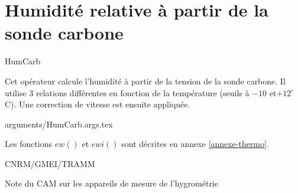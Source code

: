 %
\section{Humidit\'e relative \`a partir de la sonde carbone}

 {\sf HumCarb}

Cet op\'erateur calcule l'humidit\'e \`a partir de la tension
de la sonde carbone. Il utilise 3 relations diff\'erentes en 
fonction de la temp\'erature (seuils \`a $-10$ et$+12^\circ$C).\newline
Une correction de vitesse est ensuite appliqu\'ee.

\bigskip
 {arguments/HumCarb.args.tex}





Les fonctions $ew()$ et $ewi()$ sont d\'ecrites en annexe \ref{annexe-thermo}. 

CNRM/GMEI/TRAMM

Note du CAM sur les appareils de mesure de l'hygrom\'etrie \cite{CAM-hum}
